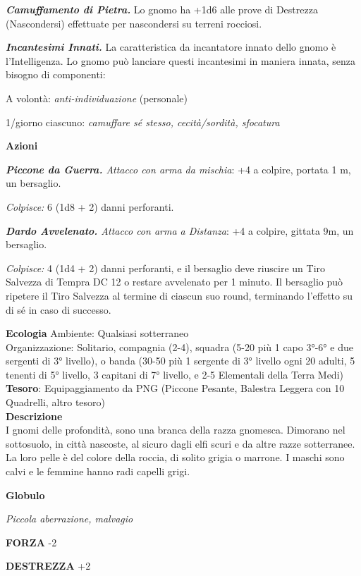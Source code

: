 \begin{multicols}{2}
	\textit{\textbf{Camuffamento di Pietra.}} Lo gnomo ha +1d6 alle prove di Destrezza (Nascondersi) effettuate per nascondersi su terreni rocciosi.

	\textit{\textbf{Incantesimi Innati.}} La caratteristica da incantatore innato dello gnomo è l'Intelligenza. Lo gnomo può lanciare questi incantesimi in maniera innata, senza bisogno di componenti:

	A volontà: \textit{anti-individuazione} (personale)

	1/giorno ciascuno: \textit{camuffare sé stesso, cecità/sordità, sfocatura}

	\textbf{Azioni}

	\textit{\textbf{Piccone da Guerra.} Attacco con arma da mischia}: +4 a colpire, portata 1 m, un bersaglio.

	\textit{Colpisce:} 6 (1d8 + 2) danni perforanti.

	\textit{\textbf{Dardo Avvelenato.} Attacco con arma a Distanza}: +4 a colpire, gittata 9m, un bersaglio.

	\textit{Colpisce:} 4 (1d4 + 2) danni perforanti, e il bersaglio deve riuscire un Tiro Salvezza di Tempra DC 12 o restare avvelenato per 1 minuto. Il bersaglio può ripetere il Tiro Salvezza al termine di ciascun suo round, terminando l'effetto su di sé in caso di successo.

	\textbf{Ecologia}
	Ambiente: Qualsiasi sotterraneo\\
	Organizzazione: Solitario, compagnia (2-4), squadra (5-20 più 1 capo 3°-6° e due sergenti di 3° livello), o banda (30-50 più 1 sergente di 3° livello ogni 20 adulti, 5 tenenti di 5° livello, 3 capitani di 7° livello, e 2-5 Elementali della Terra Medi)\\
	\textbf{Tesoro}: Equipaggiamento da PNG (Piccone Pesante, Balestra Leggera con 10 Quadrelli, altro tesoro)\\
	\textbf{Descrizione}\\
	I gnomi delle profondità, sono una branca della razza gnomesca. Dimorano nel sottosuolo, in città nascoste, al sicuro dagli elfi scuri e da altre razze sotterranee. La loro pelle è del colore della roccia, di solito grigia o marrone. I maschi sono calvi e le femmine hanno radi capelli grigi.

	\medskip{}\textbf{Globulo}

	\textit{Piccola aberrazione, malvagio}

	\textbf{FORZA} -2

	\textbf{DESTREZZA} +2


\end{multicols}

